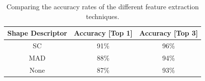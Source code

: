 \begin{table}
\centering
\caption{Comparing the accuracy rates of the different feature extraction techniques.}
\renewcommand{\arraystretch}{1.2}
\begin{tabular}{ c c c }
    \toprule
	\textbf{Shape Descriptor}  & \textbf{Accuracy [Top 1]}  & \textbf{Accuracy [Top 3]} \\
	\midrule 
	SC      & 91\% & 96\%  \\                
  	MAD     & 88\% & 94\% \\
  	None    & 87\% & 93\% \\
  	\bottomrule
\end{tabular}
\label{table:features_comparison} 
\end{table}


%
%
%
